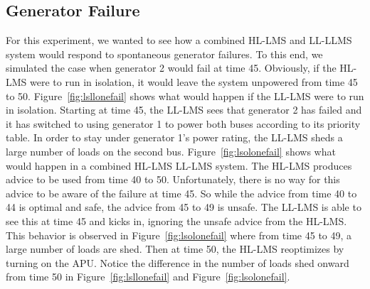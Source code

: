 \documentclass{acm_proc_article-sp}
\begin{document}
\subsection{Generator Failure}
For this experiment, we wanted to see how a combined HL-LMS and LL-LLMS
system would respond to spontaneous generator failures. To this end, we
simulated the case when generator 2 would fail at time 45. Obviously, if the HL-LMS were
to run in isolation, it would leave the system unpowered from time 45 to 50. 
Figure~\ref{fig:lsllonefail} shows what would happen if the LL-LMS were to run in 
isolation. Starting at time 45, the LL-LMS sees that generator 2 has failed and it has 
switched to using generator 1 to power both buses according to its priority table. In order
to stay under generator 1's power rating, the LL-LMS sheds a large number of loads on the 
second bus. Figure~\ref{fig:lsolonefail} shows what would happen in a combined HL-LMS
LL-LMS system. The HL-LMS produces advice to be used from time 40 to 50. Unfortunately,
there is no way for this advice to be aware of the failure at time 45. So while the advice
from time 40 to 44 is optimal and safe, the advice from 45 to 49 is unsafe. The LL-LMS is
able to see this at time 45 and kicks in, ignoring the unsafe advice from the HL-LMS. This
behavior is observed in Figure~\ref{fig:lsolonefail} where from time 45 to 49, a large
number of loads are shed. Then at time 50, the HL-LMS reoptimizes by turning on the APU.
Notice the difference in the number of loads shed onward from time 50 in 
Figure~\ref{fig:lsllonefail} and Figure~\ref{fig:lsolonefail}.
\end{document}
